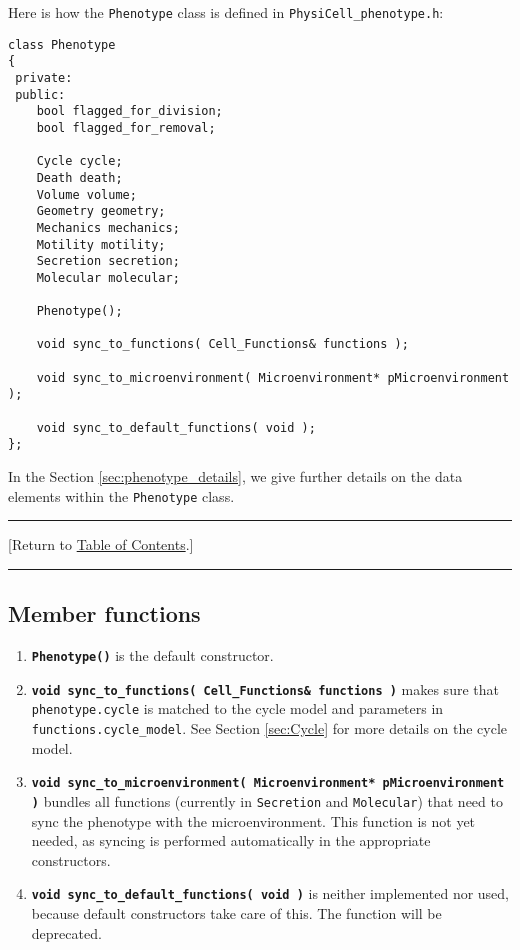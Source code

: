 \documentclass[12pt]{article}
\renewcommand{\v}{\verb}
\newcommand{\smallcode}[1]{\textbf{\texttt{#1}}}
\newcommand{\blue}[1]{\textcolor{blue}{#1}}
\newcommand{\DONE}{}%
\newcommand{\TOClink}{\begin{center}\hrule\vskip-5pt\phantom{.}\hfill[Return to \hyperlink{TOC}{Table of Contents}.]\hfill\phantom{.}\vskip3pt\hrule\end{center}}
\begin{document}
Here is how the \v|Phenotype| class is defined in \v|PhysiCell_phenotype.h|:
\begin{verbatim}
class Phenotype
{
 private:
 public:
    bool flagged_for_division; 
    bool flagged_for_removal; 
 
    Cycle cycle; 
    Death death; 
    Volume volume; 
    Geometry geometry; 
    Mechanics mechanics; 
    Motility motility; 
    Secretion secretion; 
    Molecular molecular; 
    
    Phenotype();   
    
    void sync_to_functions( Cell_Functions& functions ); 
    
    void sync_to_microenvironment( Microenvironment* pMicroenvironment ); 
    
    void sync_to_default_functions( void );   
};
\end{verbatim}
In the Section \ref{sec:phenotype_details}, we give further details on the data elements within the \v|Phenotype| class. 

\TOClink 

\subsection{Member functions \DONE}

\begin{enumerate}
\item 
\smallcode{Phenotype()} is the default constructor.  

\item 
\smallcode{void sync\_to\_functions( Cell\_Functions\& functions )} makes sure that 
\v|phenotype.cycle| is matched to the cycle model and parameters in 
\v|functions.cycle_model|. See Section \ref{sec:Cycle} for more details on the 
cycle model. 

\item 
\smallcode{void sync\_to\_microenvironment( Microenvironment* pMicroenvironment )} bundles 
all functions (currently in \v|Secretion| and \v|Molecular|) that need to sync the phenotype 
with the microenvironment. This function is not yet needed, as syncing is performed automatically 
in the appropriate constructors. 

\item 
\smallcode{void sync\_to\_default\_functions( void )} is neither implemented nor 
used, because default constructors take care of this. The function will be 
deprecated. 

\end{enumerate}
\end{document}
